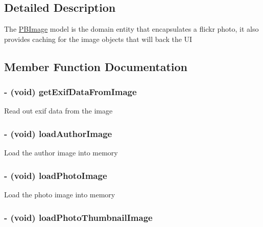 \subsection{Detailed Description}
The \hyperlink{interface_p_b_image}{PBImage} model is the domain entity that encapsulates a flickr photo, it also provides caching for the image objects that will back the UI 

\subsection{Member Function Documentation}
\hypertarget{interface_p_b_image_a78fb2648c08eabfa20cca7831d8af078}{
\subsubsection[{getExifDataFromImage}]{\setlength{\rightskip}{0pt plus 5cm}-\/ (void) getExifDataFromImage }}
\label{interface_p_b_image_a78fb2648c08eabfa20cca7831d8af078}
Read out exif data from the image \hypertarget{interface_p_b_image_a4af15f2a0b22a1cb6fb88aafbc7fa2d5}{
\subsubsection[{loadAuthorImage}]{\setlength{\rightskip}{0pt plus 5cm}-\/ (void) loadAuthorImage }}
\label{interface_p_b_image_a4af15f2a0b22a1cb6fb88aafbc7fa2d5}
Load the author image into memory \hypertarget{interface_p_b_image_a97e942803d2815e8cf393da6c6d8c78e}{
\subsubsection[{loadPhotoImage}]{\setlength{\rightskip}{0pt plus 5cm}-\/ (void) loadPhotoImage }}
\label{interface_p_b_image_a97e942803d2815e8cf393da6c6d8c78e}
Load the photo image into memory \hypertarget{interface_p_b_image_a002ec7944ae9c0e779867a42af048945}{
\subsubsection[{loadPhotoThumbnailImage}]{\setlength{\rightskip}{0pt plus 5cm}-\/ (void) loadPhotoThumbnailImage }}
